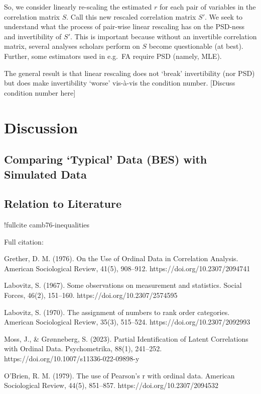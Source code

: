 \documentclass[
  12pt,
]{article}
\theoremstyle{plain}
\theoremstyle{definition}
\theoremstyle{remark}
\begin{document}
So, we consider linearly re-scaling the estimated \(r\) for each pair of
variables in the correlation matrix \(S\). Call this new rescaled
correlation matrix \(S'\). We seek to understand what the process of
pair-wise linear rescaling has on the PSD-ness and invertibility of
\(S'\). This is important because without an invertible correlation
matrix, several analyses scholars perform on \(S\) become questionable
(at best). Further, some estimators used in e.g.~FA require PSD (namely,
MLE).

The general result is that linear rescaling does not `break'
invertibility (nor PSD) but does make invertibility `worse' vis-à-vis
the condition number. {[}Discuss condition number here{]}

\section{Discussion}\label{discussion}

\subsection{Comparing `Typical' Data (BES) with Simulated
Data}\label{comparing-typical-data-bes-with-simulated-data}

\subsection{Relation to Literature}\label{relation-to-literature}

!fullcite camb76-inequalities

Full citation:

{\textcite{camb76-inequalities}}

Grether, D. M. (1976). On the Use of Ordinal Data in Correlation
Analysis. American Sociological Review, 41(5), 908--912.
https://doi.org/10.2307/2094741

Labovitz, S. (1967). Some observations on measurement and statistics.
Social Forces, 46(2), 151--160. https://doi.org/10.2307/2574595

Labovitz, S. (1970). The assignment of numbers to rank order categories.
American Sociological Review, 35(3), 515--524.
https://doi.org/10.2307/2092993

Moss, J., \& Grønneberg, S. (2023). Partial Identification of Latent
Correlations with Ordinal Data. Psychometrika, 88(1), 241--252.
https://doi.org/10.1007/s11336-022-09898-y

O'Brien, R. M. (1979). The use of Pearson's r with ordinal data.
American Sociological Review, 44(5), 851--857.
https://doi.org/10.2307/2094532
\end{document}
